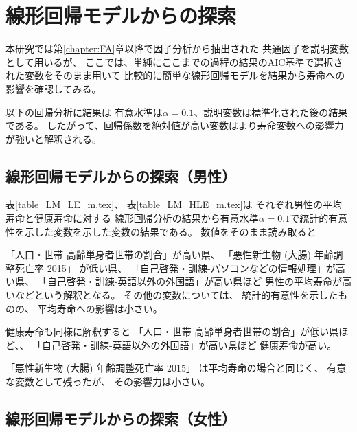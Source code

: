 \documentclass[a4j,11pt,mc]{jreport}
\begin{document}
%


\section{線形回帰モデルからの探索}

本研究では第\ref{chapter:FA}章以降で因子分析から抽出された
共通因子を説明変数として用いるが、
ここでは、単純にここまでの過程の結果のAIC基準で選択された変数をそのまま用いて
比較的に簡単な線形回帰モデルを結果から寿命への影響を確認してみる。

以下の回帰分析に結果は
有意水準は$\alpha=0.1$、説明変数は標準化された後の結果である。
したがって、回帰係数を絶対値が高い変数はより寿命変数への影響力が強いと解釈される。

\subsection{線形回帰モデルからの探索（男性）}

表\ref{table_LM_LE_m.tex}、
表\ref{table_LM_HLE_m.tex}は
それぞれ男性の平均寿命と健康寿命に対する
線形回帰分析の結果から有意水準$\alpha=0.1$で統計的有意性を示した変数を示した変数の結果である。
数値をそのまま読み取ると

「人口・世帯 高齢単身者世帯の割合」が高い県、
「悪性新生物 (大腸) 年齢調整死亡率 2015」
が低い県、
「自己啓発・訓練-パソコンなどの情報処理」が高い県、
「自己啓発・訓練-英語以外の外国語」が高い県ほど
男性の平均寿命が高いなどという解釈となる。
その他の変数については、
統計的有意性を示したものの、
平均寿命への影響は小さい。




健康寿命も同様に解釈すると
「人口・世帯 高齢単身者世帯の割合」が低い県ほど、、
「自己啓発・訓練-英語以外の外国語」が高い県ほど
健康寿命が高い。

「悪性新生物 (大腸) 年齢調整死亡率 2015」
は平均寿命の場合と同じく、
有意な変数として残ったが、
その影響力は小さい。


\subsection{線形回帰モデルからの探索（女性）}
\end{document}
